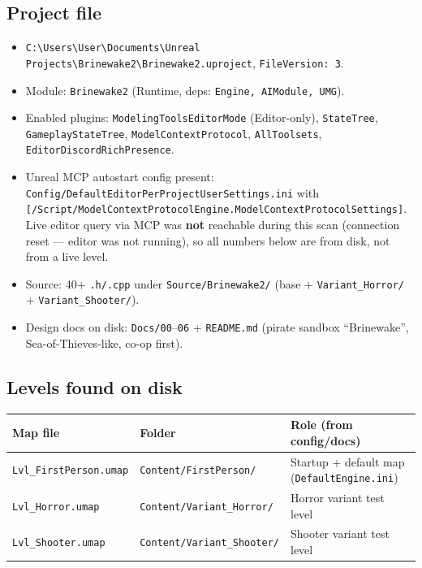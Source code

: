 \documentclass[11pt,a4paper]{article}
\begin{document}
\subsection{Project file}
\begin{itemize}[leftmargin=1.4em]
  \item \texttt{C:\textbackslash Users\textbackslash User\textbackslash Documents\textbackslash Unreal Projects\textbackslash Brinewake2\textbackslash Brinewake2.uproject}, \texttt{FileVersion: 3}.
  \item Module: \texttt{Brinewake2} (Runtime, deps: \texttt{Engine, AIModule, UMG}).
  \item Enabled plugins: \texttt{ModelingToolsEditorMode} (Editor-only), \texttt{StateTree}, \texttt{GameplayStateTree}, \texttt{ModelContextProtocol}, \texttt{AllToolsets}, \texttt{EditorDiscordRichPresence}.
  \item Unreal MCP autostart config present: \texttt{Config/DefaultEditorPerProjectUserSettings.ini} with \texttt{[/Script/ModelContextProtocolEngine.ModelContextProtocolSettings]}. Live editor query via MCP was \textbf{not} reachable during this scan (connection reset --- editor was not running), so all numbers below are from disk, not from a live level.
  \item Source: 40+ \texttt{.h/.cpp} under \texttt{Source/Brinewake2/} (base + \texttt{Variant\_Horror/} + \texttt{Variant\_Shooter/}).
  \item Design docs on disk: \texttt{Docs/00}--\texttt{06} + \texttt{README.md} (pirate sandbox ``Brinewake'', Sea-of-Thieves-like, co-op first).
\end{itemize}

\subsection{Levels found on disk}
\begin{center}
\begin{tabular}{@{}lll@{}}
\toprule
Map file & Folder & Role (from config/docs) \\
\midrule
\texttt{Lvl\_FirstPerson.umap} & \texttt{Content/FirstPerson/} & Startup + default map (\texttt{DefaultEngine.ini}) \\
\texttt{Lvl\_Horror.umap} & \texttt{Content/Variant\_Horror/} & Horror variant test level \\
\texttt{Lvl\_Shooter.umap} & \texttt{Content/Variant\_Shooter/} & Shooter variant test level \\
\bottomrule
\end{tabular}
\end{center}
\end{document}
